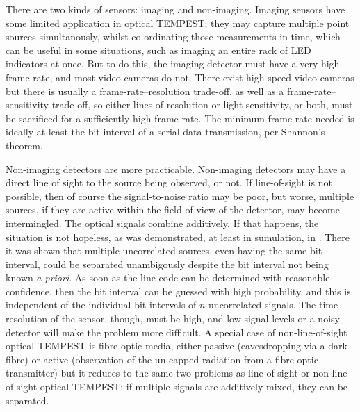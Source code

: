 \documentclass[a4paper,twoside,11pt]{book}
\begin{document}
There are two kinds of sensors: imaging and non-imaging. Imaging sensors have
some limited application in optical TEMPEST; they may capture multiple point
sources simultanously, whilst co-ordinating those measurements in time, which
can be useful in some situations, such as imaging an entire rack of LED
indicators at once. But to do this, the imaging detector must have a very high
frame rate, and most video cameras do not. There exist high-speed video cameras
but there is usually a frame-rate--resolution trade-off, as well as a
frame-rate--sensitivity trade-off, so either lines of resolution or light
sensitivity, or both, must be sacrificed for a sufficiently high frame rate.
The minimum frame rate needed is ideally at least the bit interval of a serial
data transmission, per Shannon's theorem.

Non-imaging detectors are more practicable. Non-imaging detectors may have a
direct line of sight to the source being observed, or not. If line-of-sight is
not possible, then of course the signal-to-noise ratio may be poor, but worse,
multiple sources, if they are active within the field of view of the detector,
may become intermingled. The optical signals combine additively. If that
happens, the situation is not hopeless, as was demonstrated, at least in
sumulation, in \cite[\S 8]{Loughry2002a}. There it was shown that multiple
uncorrelated sources, even having the same bit interval, could be separated
unambigously despite the bit interval not being known {\it a priori}. As soon
as the line code can be determined with reasonable confidence, then the bit
interval can be guessed with high probability, and this is independent of the
individual bit intervals of $n$ uncorrelated signals. The time resolution of
the sensor, though, must be high, and low signal levels or a noisy detector
will make the problem more difficult. A special case of non-line-of-sight
optical TEMPEST is fibre-optic media, either passive (eavesdropping via a dark
fibre) or active (observation of the un-capped radiation from a fibre-optic
transmitter) but it reduces to the same two problems as line-of-sight or
non-line-of-sight optical TEMPEST: if multiple signals are additively mixed,
they can be separated.
\end{document}
